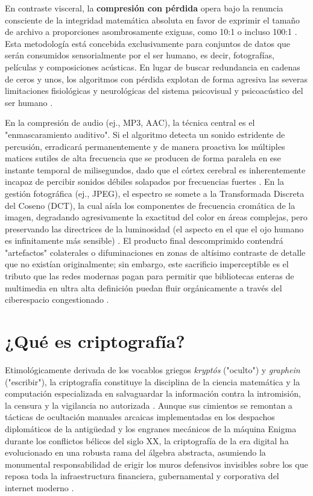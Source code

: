 \documentclass[a4paper,12pt]{article}
\begin{document}
En contraste visceral, la \textbf{compresión con pérdida} opera bajo la renuncia consciente de la integridad matemática absoluta en favor de exprimir el tamaño de archivo a proporciones asombrosamente exiguas, como 10:1 o incluso 100:1 \cite{bjc_comp}. Esta metodología está concebida exclusivamente para conjuntos de datos que serán consumidos sensorialmente por el ser humano, es decir, fotografías, películas y composiciones acústicas. En lugar de buscar redundancia en cadenas de ceros y unos, los algoritmos con pérdida explotan de forma agresiva las severas limitaciones fisiológicas y neurológicas del sistema psicovisual y psicoacústico del ser humano \cite{wix_files}. 

En la compresión de audio (ej., MP3, AAC), la técnica central es el "enmascaramiento auditivo". Si el algoritmo detecta un sonido estridente de percusión, erradicará permanentemente y de manera proactiva los múltiples matices sutiles de alta frecuencia que se producen de forma paralela en ese instante temporal de milisegundos, dado que el córtex cerebral es inherentemente incapaz de percibir sonidos débiles solapados por frecuencias fuertes \cite{wix_files}. En la gestión fotográfica (ej., JPEG), el espectro se somete a la Transformada Discreta del Coseno (DCT), la cual aísla los componentes de frecuencia cromática de la imagen, degradando agresivamente la exactitud del color en áreas complejas, pero preservando las directrices de la luminosidad (el aspecto en el que el ojo humano es infinitamente más sensible) \cite{esri_lossless, cornell_lossy}. El producto final descomprimido contendrá "artefactos" colaterales o difuminaciones en zonas de altísimo contraste de detalle que no existían originalmente; sin embargo, este sacrificio imperceptible es el tributo que las redes modernas pagan para permitir que bibliotecas enteras de multimedia en ultra alta definición puedan fluir orgánicamente a través del ciberespacio congestionado \cite{cornell_lossy, bjc_comp}.

\section{¿Qué es criptografía?}

Etimológicamente derivada de los vocablos griegos \textit{kryptós} ("oculto") y \textit{graphein} ("escribir"), la criptografía constituye la disciplina de la ciencia matemática y la computación especializada en salvaguardar la información contra la intromisión, la censura y la vigilancia no autorizada \cite{ibm_crypto_use}. Aunque sus cimientos se remontan a tácticas de ocultación manuales arcaicas implementadas en los despachos diplomáticos de la antigüedad y los engranes mecánicos de la máquina Enigma durante los conflictos bélicos del siglo XX, la criptografía de la era digital ha evolucionado en una robusta rama del álgebra abstracta, asumiendo la monumental responsabilidad de erigir los muros defensivos invisibles sobre los que reposa toda la infraestructura financiera, gubernamental y corporativa del internet moderno \cite{ibm_crypto_use, sentinel_enc}. 
\end{document}

